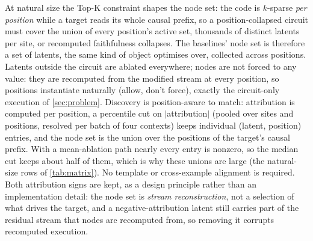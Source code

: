 \documentclass[10pt]{article}
\begin{document}
At natural size the Top-K constraint shapes the node set: the code is $k$-sparse \emph{per position} while a target reads its whole causal prefix, so a position-collapsed circuit must cover the union of every position's active set, thousands of distinct latents per site, or recomputed faithfulness collapses.
The baselines' node set is therefore a set of latents, the same kind of object  optimises over, collected across positions.
Latents outside the circuit are ablated everywhere; nodes are not forced to any value: they are recomputed from the modified stream at every position, so positions instantiate naturally (allow, don't force), exactly the circuit-only execution of \cref{sec:problem}.
Discovery is position-aware to match: attribution is computed per position, a percentile cut on $|$attribution$|$ (pooled over sites and positions, resolved per batch of four contexts) keeps individual (latent, position) entries, and the node set is the union over the positions of the target's causal prefix.
With a mean-ablation path nearly every entry is nonzero, so the median cut keeps about half of them, which is why these unions are large (the natural-size rows of \cref{tab:matrix}).
No template or cross-example alignment is required.
Both attribution signs are kept, as a design principle rather than an implementation detail: the node set is \emph{stream reconstruction}, not a selection of what drives the target, and a negative-attribution latent still carries part of the residual stream that nodes are recomputed from, so removing it corrupts recomputed execution.

\end{document}
